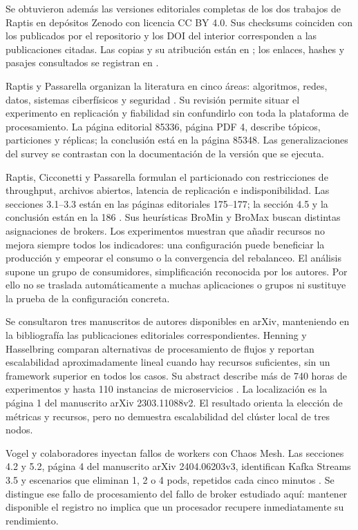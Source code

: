 \documentclass[11pt,a4paper]{article}
\begin{document}
Se obtuvieron además las versiones editoriales completas de los dos trabajos de Raptis en depósitos Zenodo con licencia CC BY 4.0. Sus checksums coinciden con los publicados por el repositorio y los DOI del interior corresponden a las publicaciones citadas. Las copias y su atribución están en ; los enlaces, hashes y pasajes consultados se registran en .

Raptis y Passarella organizan la literatura en cinco áreas: algoritmos, redes, datos, sistemas ciberfísicos y seguridad \cite{raptis2023survey}. Su revisión permite situar el experimento en replicación y fiabilidad sin confundirlo con toda la plataforma de procesamiento. La página editorial 85336, página PDF 4, describe tópicos, particiones y réplicas; la conclusión está en la página 85348. Las generalizaciones del survey se contrastan con la documentación de la versión que se ejecuta.

Raptis, Cicconetti y Passarella formulan el particionado con restricciones de throughput, archivos abiertos, latencia de replicación e indisponibilidad. Las secciones 3.1--3.3 están en las páginas editoriales 175--177; la sección 4.5 y la conclusión están en la 186 \cite{raptis2024partitioning}. Sus heurísticas BroMin y BroMax buscan distintas asignaciones de brokers. Los experimentos muestran que añadir recursos no mejora siempre todos los indicadores: una configuración puede beneficiar la producción y empeorar el consumo o la convergencia del rebalanceo. El análisis supone un grupo de consumidores, simplificación reconocida por los autores. Por ello no se traslada automáticamente a muchas aplicaciones o grupos ni sustituye la prueba de la configuración concreta.

Se consultaron tres manuscritos de autores disponibles en arXiv, manteniendo en la bibliografía las publicaciones editoriales correspondientes. Henning y Hasselbring comparan alternativas de procesamiento de flujos y reportan escalabilidad aproximadamente lineal cuando hay recursos suficientes, sin un framework superior en todos los casos. Su abstract describe más de 740 horas de experimentos y hasta 110 instancias de microservicios \cite{henning2024scalability}. La localización es la página 1 del manuscrito arXiv 2303.11088v2. El resultado orienta la elección de métricas y recursos, pero no demuestra escalabilidad del clúster local de tres nodos.

Vogel y colaboradores inyectan fallos de workers con Chaos Mesh. Las secciones 4.2 y 5.2, página 4 del manuscrito arXiv 2404.06203v3, identifican Kafka Streams 3.5 y escenarios que eliminan 1, 2 o 4 pods, repetidos cada cinco minutos \cite{vogel2024recovery}. Se distingue ese fallo de procesamiento del fallo de broker estudiado aquí: mantener disponible el registro no implica que un procesador recupere inmediatamente su rendimiento.
\end{document}
